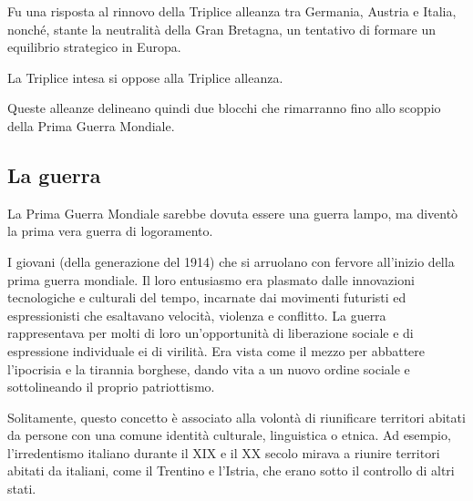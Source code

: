 \documentclass[a4paper]{article}
\begin{document}
Fu una risposta al rinnovo della Triplice alleanza tra Germania,
Austria e Italia, nonché, stante la neutralità della Gran Bretagna,
un tentativo di formare un equilibrio strategico in Europa.



La Triplice intesa si oppose alla Triplice alleanza.

Queste alleanze delineano quindi due blocchi che rimarranno fino allo scoppio della Prima
Guerra Mondiale.


\subsection{La guerra}

La Prima Guerra Mondiale sarebbe dovuta essere una guerra lampo, ma diventò la prima
vera guerra di logoramento.

I giovani (della generazione del 1914) che si arruolano con fervore
all'inizio della prima guerra mondiale.
Il loro entusiasmo era plasmato dalle innovazioni tecnologiche e culturali del tempo,
incarnate dai movimenti futuristi ed espressionisti che esaltavano velocità,
violenza e conflitto.
La guerra rappresentava per molti di loro un'opportunità di liberazione sociale e
di espressione individuale ei di virilità.
Era vista come il mezzo per abbattere l'ipocrisia e la tirannia borghese,
dando vita a un nuovo ordine sociale e sottolineando il proprio patriottismo.



Solitamente, questo concetto è associato alla volontà di riunificare territori
abitati da persone con una comune identità culturale, linguistica o etnica.
Ad esempio, l'irredentismo italiano durante il XIX e il XX secolo mirava a
riunire territori abitati da italiani, come il Trentino e l'Istria, che erano
sotto il controllo di altri stati.
\end{document}
